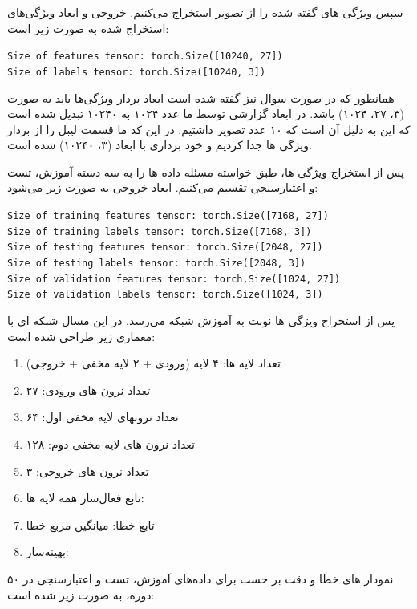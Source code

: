 \begin{qsolve}
	سپس ویژگی های گفته شده را از تصویر استخراج می‌کنیم. خروجی و ابعاد ویژگی‌های استخراج شده به صورت زیر است:
	
	\begin{latin}
		\texttt{Size of features tensor: torch.Size([10240, 27])}\\
		\texttt{Size of labels tensor: torch.Size([10240, 3])}
	\end{latin}
	همانطور که در صورت سوال نیز گفته شده است ابعاد بردار ویژگی‌ها باید به صورت (۳، ۲۷، ۱۰۲۴) باشد. در ابعاد گزارشی توسط ما عدد ۱۰۲۴ به ۱۰۲۴۰ تبدیل شده است که این به دلیل آن است که ۱۰ عدد تصویر داشتیم. در این کد ما قسمت لیبل را از بردار ویژگی ها جدا کردیم و خود برداری با ابعاد (۳، ۱۰۲۴۰) شده است.
	
	پس از استخراج ویژگی ها، طبق خواسته مسئله داده ها را به سه دسته آموزش، تست و اعتبارسنجی تقسیم می‌کنیم. ابعاد خروجی به صورت زیر می‌شود:
	
	\begin{latin}
		\texttt{Size of training features tensor: torch.Size([7168, 27])} \\
		\texttt{Size of training labels tensor: torch.Size([7168, 3])} \\
		\texttt{Size of testing features tensor: torch.Size([2048, 27])} \\
		\texttt{Size of testing labels tensor: torch.Size([2048, 3])} \\
		\texttt{Size of validation features tensor: torch.Size([1024, 27])} \\
		\texttt{Size of validation labels tensor: torch.Size([1024, 3])} \\
	\end{latin}
	
	پس از استخراج ویژگی ها نوبت به آموزش شبکه می‌رسد. در این مسال شبکه ای با معماری زیر طراحی شده است:
	
	\begin{enumerate}
		\item تعداد لایه ها: ۴ لایه (ورودی + ۲ لایه مخفی + خروجی)
		\item تعداد نرون های ورودی: ۲۷
		\item تعداد نرونهای لایه مخفی اول:‌ ۶۴
		\item تعداد نرون های لایه مخفی دوم: ۱۲۸
		\item تعداد نرون های خروجی: ۳
		\item تابع فعال‌ساز همه لایه ها: 
		\item تابع خطا: میانگین مربع خطا
		\item بهینه‌ساز: 
	\end{enumerate}
	
	نمودار های خطا و دقت بر حسب  برای داده‌های آموزش، تست و اعتبارسنجی در ۵۰ دوره، به صورت زیر شده است:	
\end{qsolve}


